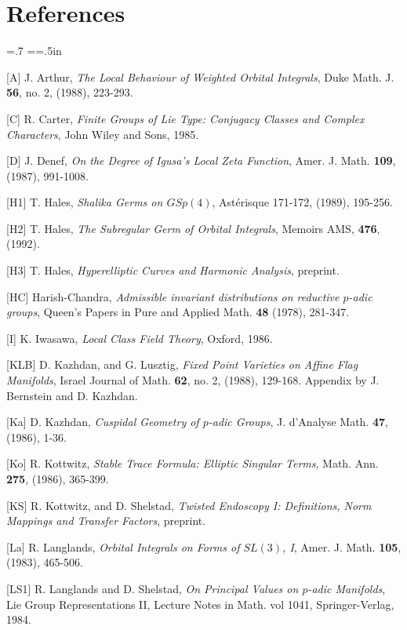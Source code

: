 \documentclass{amsart}
\begin{document}
\section{References}

{
\parindent=0pt
\baselineskip=.7\baselineskip
\everypar={\hangindent=.5in}

[A]  J. Arthur, {\it The Local Behaviour of Weighted Orbital
Integrals}, Duke Math. J. {\bf 56}, no. 2, (1988), 223-293.

[C] R. Carter, {\it Finite Groups of Lie Type: Conjugacy Classes
and Complex Characters}, John Wiley and Sons, 1985.

[D]  J. Denef, {\it On the Degree of Igusa's Local Zeta Function},
   Amer. J. Math. {\bf 109},  (1987), 991-1008.

[H1]  T. Hales, {\it Shalika Germs on $GSp(4)$}, Ast\'erisque 171-172,
    (1989),  195-256.

[H2]  T. Hales, {\it The Subregular Germ of Orbital Integrals},
   Memoirs AMS, {\bf 476}, (1992).

[H3]  T. Hales, {\it Hyperelliptic Curves and Harmonic Analysis}, preprint.

[HC]  Harish-Chandra, {\it Admissible invariant distributions on reductive
  $p$-adic groups}, Queen's Papers in Pure and Applied Math. {\bf 48} (1978),
  281-347.

[I]  K. Iwasawa, {\it Local Class Field Theory}, Oxford, 1986.

[KLB]  D. Kazhdan, and G. Lusztig, {\it Fixed Point Varieties
on Affine Flag Manifolds}, Israel Journal of Math. {\bf 62},
no. 2, (1988), 129-168. Appendix by J. Bernstein and D. Kazhdan.

[Ka]  D. Kazhdan, {\it Cuspidal Geometry of $p$-adic Groups}, J.
d'Analyse Math. {\bf 47}, (1986), 1-36.

[Ko]  R. Kottwitz, {\it Stable Trace Formula: Elliptic Singular Terms},
   Math. Ann. {\bf 275}, (1986), 365-399.

[KS]  R. Kottwitz, and D. Shelstad, 
  {\it Twisted Endoscopy I: Definitions, Norm Mappings
	and Transfer Factors}, preprint.

[La] R. Langlands, {\it Orbital Integrals on Forms of $SL(3)$, I},
   Amer. J. Math. {\bf 105},  (1983), 465-506.

[LS1]  R. Langlands and  D. Shelstad, {\it On Principal Values on $p$-adic
  Manifolds}, Lie Group Representations II, Lecture Notes in Math. vol 1041,
  Springer-Verlag, 1984.

}
\end{document}
